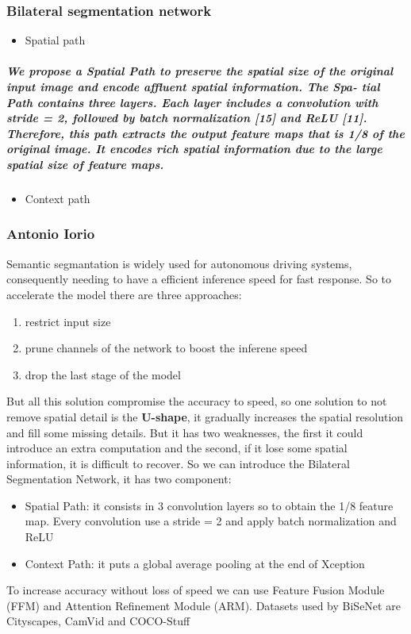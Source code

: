 \documentclass{article}
\begin{document}
            \subsubsection{Bilateral segmentation network}
                \begin{itemize}
                    \item Spatial path
                \end{itemize}
                \subparagraph{We propose a Spatial Path to preserve the spatial size of the original input image and encode affluent spatial information. The Spa- tial Path contains three layers. Each layer includes a convolution with stride = 2, followed by batch normalization [15] and ReLU [11]. Therefore, this path extracts the output feature maps that is 1/8 of the original image. It encodes rich spatial information due to the large spatial size of feature maps. }
                    \begin{itemize}
                        \item Context path
                    \end{itemize}

            \subsubsection{Antonio Iorio}
            Semantic segmantation is widely used for autonomous driving systems, 
            consequently needing to have a efficient inference speed for fast response. So to 
            accelerate the model there are three approaches:
            \begin{enumerate}
                \item restrict input size
                \item prune channels of the network to boost the inferene speed
                \item drop the last stage of the model
            \end{enumerate}
            But all this solution compromise the accuracy to speed, so one solution to 
            not remove spatial detail is the \textbf{U-shape}, it gradually increases the
            spatial resolution and fill some missing details. But it has two weaknesses,
            the first it could introduce an extra computation and the second, if it lose 
            some spatial information, it is difficult to recover.
            So we can introduce the Bilateral Segmentation Network, it has two component:
            \begin{itemize}
                \item Spatial Path: it consists in 3 convolution layers so to obtain the
                    1/8 feature map. Every convolution use a stride = 2 and apply batch normalization
                    and ReLU
                \item Context Path: it puts a global average pooling at the end of Xception
            \end{itemize}
            To increase accuracy without loss of speed we can use Feature Fusion Module (FFM) and
            Attention Refinement Module (ARM).
            Datasets used by BiSeNet are Cityscapes, CamVid and COCO-Stuff
\end{document}
